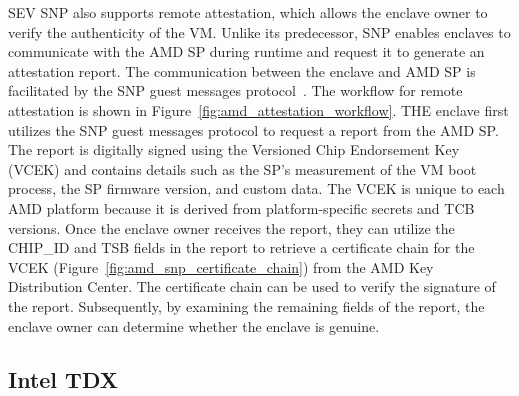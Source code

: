 SEV SNP also supports remote attestation, which allows the enclave owner to verify the authenticity of the VM. Unlike its predecessor, SNP enables enclaves to communicate with the AMD SP during runtime and request it to generate an attestation report. The communication between the enclave and AMD SP 
is facilitated by the SNP guest messages protocol~\cite*{snp_firmware, amd_sev_summarize}. The workflow for remote attestation is shown in Figure~\ref{fig:amd_attestation_workflow}. THE enclave first utilizes the SNP guest messages protocol to request a report from the AMD SP. The report is digitally signed using the Versioned Chip Endorsement Key (VCEK) and 
contains details such as the SP's measurement of the VM boot process, the SP firmware version, and custom data. The VCEK is unique to each AMD platform because it is derived from platform-specific secrets and TCB versions. Once the enclave owner receives the report,  they can utilize the CHIP\_ID and TSB fields 
in the report to retrieve a certificate chain for the VCEK (Figure~\ref{fig:amd_snp_certificate_chain}) from the AMD Key Distribution Center. The certificate chain can be used to verify the signature of the report. Subsequently, by examining the remaining fields of the report, the enclave owner can determine whether the 
enclave is genuine.

\subsection{Intel TDX}
\label{subsec:tdx}

